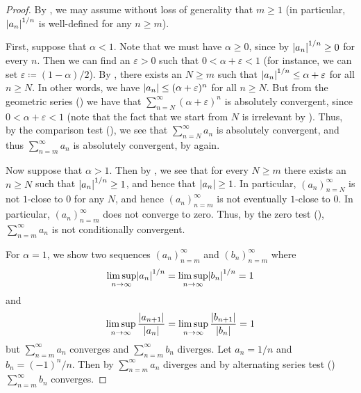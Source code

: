 \begin{proof}
  By , we may assume without loss of generality that \(m \geq 1\)
  (in particular, \(\left\lvert a_n\right\rvert^{1 / n}\) is well-defined for any \(n \geq m\)).

  First, suppose that \(\alpha < 1\).
  Note that we must have \(\alpha \geq 0\), since by  \(\left\lvert a_n\right\rvert^{1 / n} \geq 0\) for every \(n\).
  Then we can find an \(\varepsilon > 0\) such that \(0 < \alpha + \varepsilon < 1\) (for instance, we can set \(\varepsilon \coloneqq (1 - \alpha) / 2\)).
  By , there exists an \(N \geq m\) such that \(\left\lvert a_n\right\rvert^{1 / n} \leq \alpha + \varepsilon\) for all \(n \geq N\).
  In other words, we have \(\left\lvert a_n\right\rvert \leq (\alpha + \varepsilon)^n\) for all \(n \geq N\).
  But from the geometric series () we have that \(\sum_{n = N}^\infty (\alpha + \varepsilon)^n\) is absolutely convergent, since \(0 < \alpha + \varepsilon < 1\)
  (note that the fact that we start from \(N\) is irrelevant by ).
  Thus, by the comparison test (), we see that \(\sum_{n = N}^\infty a_n\) is absolutely convergent, and thus \(\sum_{n = m}^\infty a_n\) is absolutely convergent, by  again.

  Now suppose that \(\alpha > 1\).
  Then by , we see that for every \(N \geq m\) there exists an \(n \geq N\) such that \(\left\lvert a_n\right\rvert^{1 / n} \geq 1\), and hence that \(\left\lvert a_n\right\rvert \geq 1\).
  In particular, \((a_n)_{n = N}^\infty\) is not \(1\)-close to \(0\) for any \(N\), and hence \((a_n)_{n = m}^\infty\) is not eventually \(1\)-close to \(0\).
  In particular, \((a_n)_{n = m}^\infty\) does not converge to zero.
  Thus, by the zero test (), \(\sum_{n = m}^\infty a_n\) is not conditionally convergent.

  For \(\alpha = 1\), we show two sequences \((a_n)_{n = m}^\infty\) and \((b_n)_{n = m}^\infty\) where
  \[
    \limsup_{n \to \infty} \abs{a_n}^{1 / n} = \limsup_{n \to \infty} \abs{b_n}^{1 / n} = 1
  \]
  and
  \[
    \limsup_{n \to \infty} \dfrac{\left\lvert a_{n + 1}\right\rvert}{\left\lvert a_n\right\rvert} = \limsup_{n \to \infty} \dfrac{\left\lvert b_{n + 1}\right\rvert}{\left\lvert b_n\right\rvert} = 1
  \]
  but \(\sum_{n = m}^\infty a_n\) converges and \(\sum_{n = m}^\infty b_n\) diverges.
  Let \(a_n = 1 / n\) and \(b_n = (-1)^n / n\).
  Then by  \(\sum_{n = m}^\infty a_n\) diverges and by alternating series test () \(\sum_{n = m}^\infty b_n\) converges.


\end{proof}
